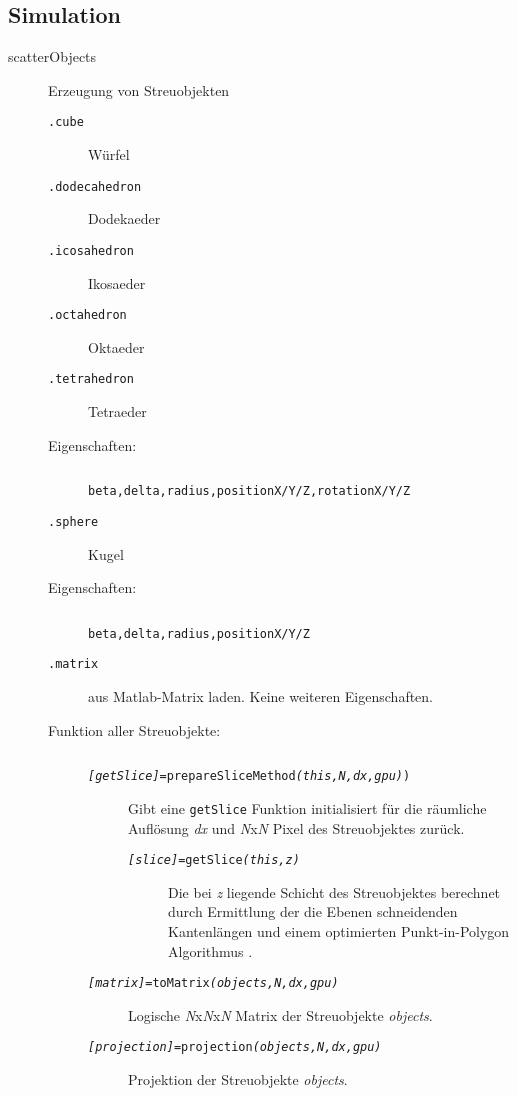 \subsection*{Simulation}
\begin{description}
	\item[scatterObjects]Erzeugung von Streuobjekten
	\begin{description}
		\item[\texttt{.cube}] Würfel
		\item[\texttt{.dodecahedron}] Dodekaeder
		\item[\texttt{.icosahedron}] Ikosaeder
		\item[\texttt{.octahedron}] Oktaeder
		\item[\texttt{.tetrahedron}] Tetraeder
		\item[\normalfont Eigenschaften:]$ $
		\begin{description}
			\item[\texttt{beta,delta,radius,positionX/Y/Z,rotationX/Y/Z}]
		\end{description}
		
		\item[\texttt{.sphere}] Kugel
		\item[\normalfont Eigenschaften:]$ $
		\begin{description}
			\item[\texttt{beta,delta,radius,positionX/Y/Z}]
		\end{description}
		
		\item[\texttt{.matrix}] aus Matlab-Matrix laden. Keine weiteren Eigenschaften.
		\item[\normalfont Funktion aller Streuobjekte:]$ $
			\begin{description}
				\item[\texttt{\textit{[getSlice]}=prepareSliceMethod\textit{(this,N,dx,gpu)})}] Gibt eine \texttt{getSlice} Funktion initialisiert für die räumliche Auflösung \textit{dx} und \textit{N}x\textit{N} Pixel des Streuobjektes zurück.
				\begin{description}
					\item [\texttt{\textit{[slice]}=getSlice\textit{(this,z)}}] Die bei \textit{z} liegende Schicht des Streuobjektes berechnet durch Ermittlung der die Ebenen schneidenden Kantenlängen und einem optimierten Punkt-in-Polygon Algorithmus \cite{pnpoly}.
				\end{description}
				
				\item[\texttt{\textit{[matrix]}=toMatrix\textit{(objects,N,dx,gpu)}}] Logische \textit{N}x\textit{N}x\textit{N} Matrix der Streuobjekte \textit{objects}.
				\item[\texttt{\textit{[projection]}=projection\textit{(objects,N,dx,gpu)}}] Projektion der Streuobjekte \textit{objects}.
			\end{description}
	\end{description}	
\end{description}


